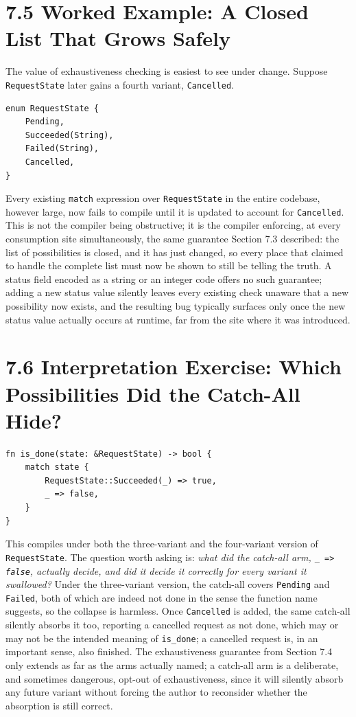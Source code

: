 \documentclass[11pt]{book}
\begin{document}
\section*{7.5 Worked Example: A Closed List That Grows Safely}

The value of exhaustiveness checking is easiest to see under change. Suppose \texttt{RequestState} later gains a fourth variant, \texttt{Cancelled}.

\begin{lstlisting}
enum RequestState {
    Pending,
    Succeeded(String),
    Failed(String),
    Cancelled,
}
\end{lstlisting}

Every existing \texttt{match} expression over \texttt{RequestState} in the entire codebase, however large, now fails to compile until it is updated to account for \texttt{Cancelled}. This is not the compiler being obstructive; it is the compiler enforcing, at every consumption site simultaneously, the same guarantee Section 7.3 described: the list of possibilities is closed, and it has just changed, so every place that claimed to handle the complete list must now be shown to still be telling the truth. A status field encoded as a string or an integer code offers no such guarantee; adding a new status value silently leaves every existing check unaware that a new possibility now exists, and the resulting bug typically surfaces only once the new status value actually occurs at runtime, far from the site where it was introduced.

\section*{7.6 Interpretation Exercise: Which Possibilities Did the Catch-All Hide?}

\begin{lstlisting}
fn is_done(state: &RequestState) -> bool {
    match state {
        RequestState::Succeeded(_) => true,
        _ => false,
    }
}
\end{lstlisting}

This compiles under both the three-variant and the four-variant version of \texttt{RequestState}. The question worth asking is: \emph{what did the catch-all arm, \texttt{\_ => false}, actually decide, and did it decide it correctly for every variant it swallowed?} Under the three-variant version, the catch-all covers \texttt{Pending} and \texttt{Failed}, both of which are indeed not done in the sense the function name suggests, so the collapse is harmless. Once \texttt{Cancelled} is added, the same catch-all silently absorbs it too, reporting a cancelled request as not done, which may or may not be the intended meaning of \texttt{is\_done}; a cancelled request is, in an important sense, also finished. The exhaustiveness guarantee from Section 7.4 only extends as far as the arms actually named; a catch-all arm is a deliberate, and sometimes dangerous, opt-out of exhaustiveness, since it will silently absorb any future variant without forcing the author to reconsider whether the absorption is still correct.
\end{document}
